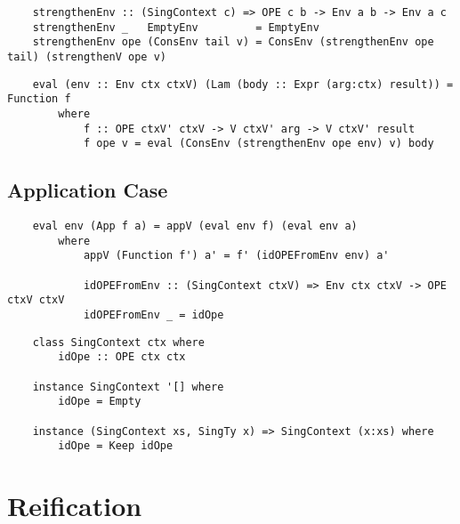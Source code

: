 \begin{lstlisting}
    strengthenEnv :: (SingContext c) => OPE c b -> Env a b -> Env a c
    strengthenEnv _   EmptyEnv         = EmptyEnv
    strengthenEnv ope (ConsEnv tail v) = ConsEnv (strengthenEnv ope tail) (strengthenV ope v)
\end{lstlisting}


\begin{lstlisting}
    eval (env :: Env ctx ctxV) (Lam (body :: Expr (arg:ctx) result)) = Function f 
        where
            f :: OPE ctxV' ctxV -> V ctxV' arg -> V ctxV' result
            f ope v = eval (ConsEnv (strengthenEnv ope env) v) body
\end{lstlisting}

\subsection{Application Case}


\begin{lstlisting}
    eval env (App f a) = appV (eval env f) (eval env a) 
        where
            appV (Function f') a' = f' (idOPEFromEnv env) a'

            idOPEFromEnv :: (SingContext ctxV) => Env ctx ctxV -> OPE ctxV ctxV
            idOPEFromEnv _ = idOpe 
\end{lstlisting}

\begin{lstlisting}
    class SingContext ctx where
        idOpe :: OPE ctx ctx

    instance SingContext '[] where
        idOpe = Empty

    instance (SingContext xs, SingTy x) => SingContext (x:xs) where
        idOpe = Keep idOpe
\end{lstlisting}


\section{Reification}

